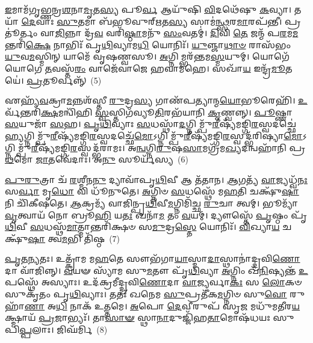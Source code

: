 {\anuvakamend[{𑌇\-\ul{𑌦𑍍𑌯}\-𑌜𑍍𑌞𑌂 𑌪𑍍𑌰 𑌸𑍁᳴\-\ul{𑌵} 𑌨𑌾\-\ul{𑌰𑌿}\-𑌰𑌾𑌨𑍁᳴𑌷𑍍𑌟𑍁𑌭𑍇𑌨 \ul{𑌤𑍍𑌵𑌾} 𑌛𑌨𑍍𑌦᳴\-\ul{𑌸𑌾} 𑌤𑍍𑌰𑍀𑌣𑌿᳴ 𑌚}]}%

\-\ul{𑌇}\-𑌮𑌾𑌮᳴𑌗𑍃𑌭𑍍𑌣𑌨𑍍𑌰\-\ul{𑌶}\-𑌨𑌾\-\ul{𑌮𑍃}\-𑌤\-\ul{𑌸𑍍𑌯} 𑌪𑍂\-\ul{𑌰𑍍𑌵} 𑌆𑌯𑍁᳴𑌷𑌿 \ul{𑌵𑌿}\-𑌦𑌥𑍇᳴𑌷𑍁 \ul{𑌕}\-𑌵𑍍𑌯𑌾। 𑌤𑌯𑌾᳴ \ul{𑌦𑍇}\-𑌵𑌾𑌃 \ul{𑌸𑍁}\-𑌤𑌮𑌾 𑌬᳴𑌭𑍂𑌵𑍁𑌰𑍍\mbox{}\-\ul{𑌋}\-𑌤\-\ul{𑌸𑍍𑌯} 𑌸𑌾𑌮॑\-\ul{𑌨𑍍𑌥𑍍𑌸}\-𑌰\-\ul{𑌮𑌾}\-𑌰𑌪᳴𑌨𑍍𑌤𑍀। 𑌪𑍍𑌰𑌤𑍂॑𑌰𑍍𑌤𑌂 𑌵𑌾\-\ul{𑌜𑌿}\-𑌨𑍍𑌨𑌾 𑌦𑍍𑌰᳴\-\ul{𑌵} 𑌵𑌰𑌿᳴\-\ul{𑌷𑍍𑌠𑌾}\-𑌮𑌨𑍁᳴ \ul{𑌸𑌂}\-𑌵𑌤𑌮𑍍॑। \ul{𑌦𑌿}\-𑌵𑌿 \ul{𑌤𑍇} 𑌜𑌨𑍍𑌮᳴ 𑌪\-\ul{𑌰}\-𑌮\-\ul{𑌮}\-𑌨𑍍𑌤𑌰𑌿᳴\-\ul{𑌕𑍍𑌷𑍇} 𑌨𑌾𑌭𑌿𑌃᳴ 𑌪𑍃\-\ul{𑌥𑌿}\-𑌵𑍍𑌯𑌾𑌮\-\ul{𑌧𑌿} 𑌯𑍋𑌨𑌿𑌃᳴। \ul{𑌯𑍁}\-𑌞𑍍𑌜𑌾\-\ul{𑌥𑌾}\-\-\ul{𑍞} 𑌰𑌾𑌸᳴𑌭𑌂 \ul{𑌯𑍁}\-𑌵\-\ul{𑌮}\-𑌸𑍍𑌮𑌿𑌨𑍍 𑌯𑌾𑌮𑍇᳴ 𑌵𑍃𑌷𑌣𑍍𑌵𑌸𑍂। \ul{𑌅}\-𑌗𑍍𑌨𑌿𑌮𑍍𑌭𑌰᳴𑌨𑍍𑌤𑌮\-\ul{𑌸𑍍𑌮}\-𑌯𑍁𑌮𑍍। 𑌯𑍋𑌗𑍇᳴𑌯𑍋𑌗𑍇 \ul{𑌤}\-𑌵𑌸𑍍𑌤᳴\-\ul{𑌰𑌂} 𑌵𑌾𑌜𑍇᳴𑌵𑌾𑌜𑍇 𑌹𑌵𑌾𑌮𑌹𑍇। 𑌸𑌖𑌾᳴\-\ul{𑌯} 𑌇𑌨𑍍𑌦𑍍𑌰᳴\-\ul{𑌮𑍂}\-𑌤𑌯𑍇॑। \ul{𑌪𑍍𑌰}\-𑌤𑍂𑌰𑍍𑌵𑌨𑍍𑌨𑍍᳴~(5)

𑌏𑌹𑍍𑌯᳴\-\ul{𑌵}\-𑌕𑍍𑌰𑌾\-\ul{𑌮}\-𑌨𑍍𑌨𑌶᳴𑌸𑍍𑌤𑍀 \ul{𑌰𑍁}\-𑌦𑍍𑌰\-\ul{𑌸𑍍𑌯} 𑌗𑌾𑌣᳴𑌪𑌤𑍍𑌯𑌾𑌨𑍍𑌮\-\ul{𑌯𑍋}\-𑌭𑍂𑌰𑍇𑌹𑌿᳴। \ul{𑌉}\-𑌰𑍍𑌵᳴𑌨𑍍𑌤𑌰𑌿᳴\-\ul{𑌕𑍍𑌷}\-𑌮𑌨𑍍𑌵𑌿᳴𑌹𑌿 \ul{𑌸𑍍𑌵}\-𑌸𑍍𑌤𑌿𑌗᳴𑌵𑍍𑌯𑍂\-\ul{𑌤𑌿}\-𑌰𑌭᳴𑌯𑌾𑌨𑌿 \ul{𑌕𑍃}\-𑌣𑍍𑌵𑌨𑍍𑌨𑍍। \ul{𑌪𑍂}\-𑌷𑍍𑌣𑌾 \ul{𑌸}\-𑌯𑍁𑌜𑌾᳴ \ul{𑌸}\-𑌹। \ul{𑌪𑍃}\-\-\ul{𑌥𑌿}\-𑌵𑍍𑌯𑌾𑌃 \ul{𑌸}\-𑌧𑌸𑍍𑌥𑌾᳴\-\ul{𑌦}\-𑌗𑍍𑌨𑌿𑌮𑍍𑌪𑍁᳴\-\ul{𑌰𑍀}\-𑌷𑍍𑌯᳴𑌮𑌙𑍍𑌗𑌿\-\ul{𑌰}\-𑌸𑍍𑌵𑌦𑌚𑍍𑌛𑍇॑\-\ul{𑌹𑍍𑌯}\-𑌗𑍍𑌨𑌿𑌮𑍍𑌪𑍁᳴\-\ul{𑌰𑍀}\-𑌷𑍍𑌯᳴𑌮𑌙𑍍𑌗𑌿\-\ul{𑌰}\-𑌸𑍍𑌵𑌦𑌚𑍍𑌛𑍇᳴\-\ul{𑌮𑍋}\-\-𑌽𑌗𑍍𑌨𑌿𑌮𑍍𑌪𑍁᳴\-\ul{𑌰𑍀}\-𑌷𑍍𑌯᳴𑌮𑌙𑍍𑌗𑌿\-\ul{𑌰}\-\-𑌸𑍍𑌵𑌦𑍍𑌭᳴𑌰𑌿𑌷𑍍𑌯𑌾\-\ul{𑌮𑍋}\-\-𑌽𑌗𑍍𑌨𑌿𑌮𑍍𑌪𑍁᳴\-\ul{𑌰𑍀}\-𑌷𑍍𑌯᳴𑌮𑌙𑍍𑌗𑌿\-\ul{𑌰}\-𑌸𑍍𑌵𑌦𑍍𑌭᳴𑌰𑌾𑌮𑌃। 𑌅\-\ul{𑌨𑍍𑌵}\-𑌗𑍍𑌨𑌿\-\ul{𑌰𑍁}\-𑌷\-\ul{𑌸𑌾}\-𑌮𑌗𑍍𑌰᳴𑌮\-\ul{𑌖𑍍𑌯}\-𑌦𑌨𑍍𑌵𑌹𑌾᳴𑌨𑌿 𑌪𑍍𑌰\-\ul{𑌥}\-𑌮𑍋 \ul{𑌜𑌾}\-𑌤𑌵𑍇᳴𑌦𑌾𑌃। 𑌅\-\ul{𑌨𑍁} 𑌸𑍂𑌰𑍍𑌯᳴𑌸𑍍𑌯~(6)

\-\ul{𑌪𑍁}\-\-\ul{𑌰𑍁}\-𑌤𑍍𑌰𑌾 𑌚᳴ \ul{𑌰}\-𑌶𑍍𑌮𑍀𑌨\-\ul{𑌨𑍁} 𑌦𑍍𑌯𑌾𑌵𑌾᳴𑌪𑍃\-\ul{𑌥𑌿}\-𑌵𑍀 𑌆 𑌤᳴𑌤𑌾𑌨। \ul{𑌆}\-𑌗𑌤𑍍𑌯᳴ \ul{𑌵𑌾}\-𑌜𑍍𑌯𑌧𑍍𑌵᳴\-\ul{𑌨𑌃} 𑌸\-\ul{𑌰𑍍𑌵𑌾} 𑌮𑍃\-\ul{𑌧𑍋} 𑌵𑌿 𑌧𑍂᳴𑌨𑍁𑌤𑍇। \ul{𑌅}\-𑌗𑍍𑌨𑌿𑍞 \ul{𑌸}\-𑌧𑌸𑍍𑌥𑍇᳴ 𑌮\-\ul{𑌹}\-𑌤𑌿 𑌚𑌕𑍍𑌷𑍁᳴\-\ul{𑌷𑌾} 𑌨𑌿 𑌚𑌿᳴𑌕𑍀𑌷𑌤𑍇। \ul{𑌆}\-𑌕𑍍𑌰𑌮𑍍𑌯᳴ 𑌵𑌾𑌜𑌿𑌨𑍍𑌪𑍃\-\ul{𑌥𑌿}\-𑌵𑍀\-\ul{𑌮}\-𑌗𑍍𑌨𑌿𑌮𑌿᳴𑌚𑍍𑌛 \ul{𑌰𑍁}\-𑌚𑌾 𑌤𑍍𑌵𑌮𑍍। 𑌭𑍂𑌮𑍍𑌯𑌾᳴ \ul{𑌵𑍃}\-𑌤𑍍𑌵𑌾𑌯᳴ 𑌨𑍋 𑌬𑍍𑌰𑍂\-\ul{𑌹𑌿} 𑌯\-\ul{𑌤𑌃} 𑌖𑌨𑌾᳴\-\ul{𑌮} 𑌤𑌂 \ul{𑌵}\-𑌯𑌮𑍍। 𑌦𑍍𑌯𑍗𑌸𑍍𑌤𑍇᳴ \ul{𑌪𑍃}\-𑌷𑍍𑌠𑌂 𑌪𑍃᳴\-\ul{𑌥𑌿}\-𑌵𑍀 \ul{𑌸}\-𑌧𑌸𑍍𑌥᳴\-\ul{𑌮𑌾}\-𑌤𑍍𑌮𑌾𑌨𑍍𑌤𑌰𑌿᳴𑌕𑍍𑌷𑍞 𑌸\-\ul{𑌮𑍁}\-𑌦𑍍𑌰\-\ul{𑌸𑍍𑌤𑍇} 𑌯𑍋𑌨𑌿𑌃᳴। \ul{𑌵𑌿}\-𑌖𑍍𑌯𑌾\-\ul{𑌯} 𑌚𑌕𑍍𑌷𑍁᳴\-\ul{𑌷𑌾} 𑌤𑍍𑌵\-\ul{𑌮}\-𑌭𑌿 𑌤𑌿᳴𑌷𑍍𑌠~(7)

\-\ul{𑌪𑍃}\-\-\ul{𑌤}\-\-\ul{𑌨𑍍𑌯}\-𑌤𑌃। 𑌉𑌤𑍍𑌕𑍍𑌰𑌾᳴𑌮 𑌮\-\ul{𑌹}\-𑌤𑍇 𑌸𑍗𑌭᳴𑌗𑌾\-\ul{𑌯𑌾}\-𑌸𑍍𑌮𑌾\-\ul{𑌦𑌾}\-𑌸𑍍𑌥𑌾𑌨𑌾॑𑌦𑍍𑌦𑍍𑌰𑌵𑌿\-\ul{𑌣𑍋}\-𑌦𑌾 𑌵𑌾᳴𑌜𑌿𑌨𑍍𑌨𑍍। \ul{𑌵}\-𑌯𑍟 𑌸𑍍𑌯𑌾᳴𑌮 𑌸𑍁\-\ul{𑌮}\-𑌤𑍗 𑌪𑍃᳴\-\ul{𑌥𑌿}\-𑌵𑍍𑌯𑌾 \ul{𑌅}\-𑌗𑍍𑌨𑌿𑌂 𑌖᳴\-\ul{𑌨𑌿}\-𑌷𑍍𑌯𑌨𑍍𑌤᳴ \ul{𑌉}\-𑌪𑌸𑍍𑌥𑍇᳴ 𑌅𑌸𑍍𑌯𑌾𑌃। 𑌉𑌦᳴𑌕𑍍𑌰𑌮𑍀𑌦𑍍𑌦𑍍𑌰𑌵𑌿\-\ul{𑌣𑍋}\-𑌦𑌾 \ul{𑌵𑌾}\-𑌜𑍍𑌯𑌰𑍍𑌵𑌾\-\ul{𑌕𑌃} 𑌸 \ul{𑌲𑍋}\-𑌕𑍞 𑌸𑍁𑌕𑍃᳴𑌤𑌂 𑌪𑍃\-\ul{𑌥𑌿}\-𑌵𑍍𑌯𑌾𑌃। 𑌤𑌤𑌃᳴ 𑌖𑌨𑍇𑌮 \ul{𑌸𑍁}\-𑌪𑍍𑌰𑌤𑍀᳴𑌕\-\ul{𑌮}\-𑌗𑍍𑌨𑌿𑍞 𑌸𑍁\-\ul{𑌵𑍋} 𑌰𑍁𑌹𑌾᳴\-\ul{𑌣𑌾} 𑌅\-\ul{𑌧𑌿} 𑌨𑌾𑌕᳴ 𑌉\-\ul{𑌤𑍍𑌤}\-𑌮𑍇। \ul{𑌅}\-𑌪𑍋 \ul{𑌦𑍇}\-𑌵𑍀𑌰𑍁𑌪᳴ 𑌸𑍃\-\ul{𑌜} 𑌮𑌧𑍁᳴𑌮𑌤𑍀𑌰\-\ul{𑌯}\-𑌕𑍍𑌷𑍍𑌮𑌾𑌯᳴ \ul{𑌪𑍍𑌰}\-𑌜𑌾𑌭𑍍𑌯𑌃᳴। 𑌤𑌾\-\ul{𑌸𑌾}\-\-\ul{𑍟} 𑌸𑍍𑌥𑌾\-\ul{𑌨𑌾}\-𑌦𑍁𑌜𑍍𑌜𑌿᳴𑌹\-\ul{𑌤𑌾}\-𑌮𑍋𑌷᳴𑌧𑌯𑌃 𑌸𑍁𑌪𑌿\-\ul{𑌪𑍍𑌪}\-𑌲𑌾𑌃। 𑌜𑌿𑌘᳴𑌰𑍍𑌮𑌿~(8)

